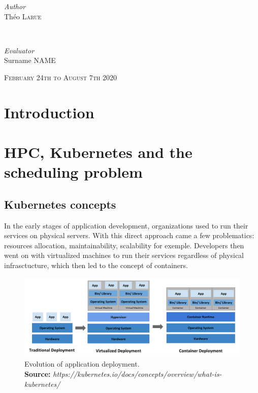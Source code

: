 \documentclass[12pt]{report}
\newcommand*{\captionsource}[2]{%
    \caption[{#1}]{%
        #1%
        \\\hspace{\linewidth}%
	\textbf{Source:} \textit{#2}%
    }%
}
\begin{document}
\begin{titlepage}
    \begin{minipage}{0.4\textwidth}
        \begin{flushleft}
            \large
	    \textit{Author}\\
            Théo \textsc{Larue}
        \end{flushleft}
    \end{minipage}
    ~
    \begin{minipage}{0.4\textwidth}
        \begin{flushright}
            \large
	    \textit{Evaluator}\\
	    Surname \textsc{NAME}
        \end{flushright}
    \end{minipage}

    \vspace{2cm}

    \vspace{2cm}
    \vfill
    \textsc{\large February 24th to August 7th 2020}\\[0.5cm]


\end{titlepage}

\tableofcontents
\newpage

\chapter{Introduction}


\chapter{HPC, Kubernetes and the scheduling problem}

\section{Kubernetes concepts}

In the early stages of application development, organizations used to run their
services on physical servers. With this direct approach came a few
problematics: resources allocation, maintainability, scalability for exemple.
Developers then went on with virtualized machines to run their services
regardless of physical infrasctucture, which then led to the concept of
containers.

\begin{figure}[]
	\centering
	\includegraphics[width=\textwidth]{imgs/container_evolution.png}
	\captionsource{Evolution of application deployment.}{https://kubernetes.io/docs/concepts/overview/what-is-kubernetes/}
	\label{fig:container-evolution}
\end{figure}
\end{document}
